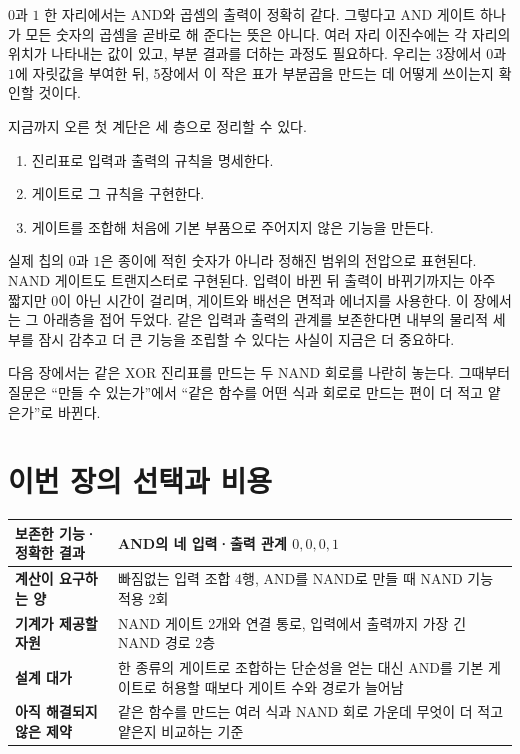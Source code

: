 \(0\)과 \(1\) 한 자리에서는 AND와 곱셈의 출력이 정확히 같다. 그렇다고 AND 게이트 하나가 모든 숫자의 곱셈을 곧바로 해 준다는 뜻은 아니다. 여러 자리 이진수에는 각 자리의 위치가 나타내는 값이 있고, 부분 결과를 더하는 과정도 필요하다. 우리는 3장에서 \(0\)과 \(1\)에 자릿값을 부여한 뒤, 5장에서 이 작은 표가 부분곱을 만드는 데 어떻게 쓰이는지 확인할 것이다.

지금까지 오른 첫 계단은 세 층으로 정리할 수 있다.

\begin{enumerate}
  \item 진리표로 입력과 출력의 규칙을 명세한다.
  \item 게이트로 그 규칙을 구현한다.
  \item 게이트를 조합해 처음에 기본 부품으로 주어지지 않은 기능을 만든다.
\end{enumerate}

실제 칩의 \(0\)과 \(1\)은 종이에 적힌 숫자가 아니라 정해진 범위의 전압으로 표현된다. NAND 게이트도 트랜지스터로 구현된다. 입력이 바뀐 뒤 출력이 바뀌기까지는 아주 짧지만 \(0\)이 아닌 시간이 걸리며, 게이트와 배선은 면적과 에너지를 사용한다. 이 장에서는 그 아래층을 접어 두었다. 같은 입력과 출력의 관계를 보존한다면 내부의 물리적 세부를 잠시 감추고 더 큰 기능을 조립할 수 있다는 사실이 지금은 더 중요하다.

다음 장에서는 같은 XOR 진리표를 만드는 두 NAND 회로를 나란히 놓는다. 그때부터 질문은 ``만들 수 있는가''에서 ``같은 함수를 어떤 식과 회로로 만드는 편이 더 적고 얕은가''로 바뀐다.

\section*{이번 장의 선택과 비용}

\begin{center}
\small
\begin{tabular}{>{\raggedright\arraybackslash\sffamily\bfseries}p{} >{\raggedright\arraybackslash}p{}}
\toprule
보존한 기능·정확한 결과 & AND의 네 입력·출력 관계 \(0,0,0,1\) \\
\midrule
계산이 요구하는 양 & 빠짐없는 입력 조합 4행, AND를 NAND로 만들 때 NAND 기능 적용 2회 \\
\midrule
기계가 제공할 자원 & NAND 게이트 2개와 연결 통로, 입력에서 출력까지 가장 긴 NAND 경로 2층 \\
\midrule
설계 대가 & 한 종류의 게이트로 조합하는 단순성을 얻는 대신 AND를 기본 게이트로 허용할 때보다 게이트 수와 경로가 늘어남 \\
\midrule
아직 해결되지 않은 제약 & 같은 함수를 만드는 여러 식과 NAND 회로 가운데 무엇이 더 적고 얕은지 비교하는 기준 \\
\bottomrule
\end{tabular}
\end{center}
